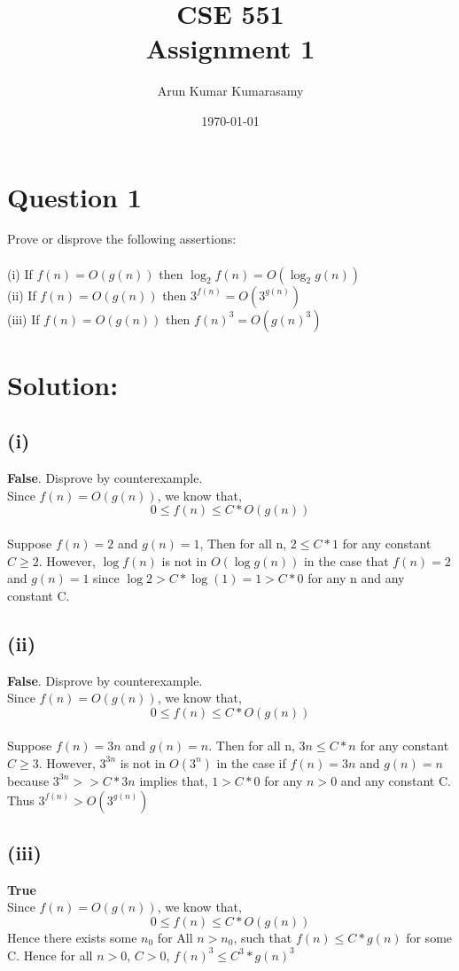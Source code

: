 \documentclass[12pt, letterpaper]{article}
\begin{document}
\title {\textbf {CSE 551
\\Assignment 1}}
\author {Arun Kumar Kumarasamy}
\date{\today}
\maketitle

\section*{Question 1}
 Prove or disprove the following assertions:\\ 
\\(i) If $f(n) =O(g(n))$ then $\log_2 f(n) =O(\log_2 g(n))$
\\(ii) If $f(n) =O(g(n))$ then $3^{f(n)}=O(3^{g(n)})$
\\(iii) If $f(n) =O(g(n))$ then $f(n)^{3}=O(g(n)^{3})$ 
\section*{Solution:}
\subsection*{(i)} \textbf{False}. Disprove by counterexample.
\\Since $f(n) = O(g(n))$, we know that, $$ 0 \leq  f(n) \leq C * O(g(n)) $$
\\Suppose $f(n) = 2$ and $g(n) = 1$, Then for all n,  $2 \leq C * 1$ for any constant $C \geq 2$. However, $\log f(n)$ is not in $O(\log g(n))$ in the case that $f(n) = 2$ and $ g(n) = 1$  since $ \log 2 > C * \log (1) = 1 > C * 0$ for any n and any constant C.\\
\subsection*{(ii)} \textbf{False}. Disprove by counterexample.
\\Since $f(n) = O(g(n))$, we know that, $$ 0 \leq  f(n) \leq C * O(g(n)) $$
\\Suppose $f(n) = 3n$ and $g(n) = n$. Then for all n, $3n \leq C * n$ for any constant $C \geq 3$. However, $3^{3n}$ is not in $O(3^{n})$ in the case if $f(n) = 3n$ and $g(n) =n$ because $3^{3n} >> C*3n$ implies that, $1>C*0$ for any $n>0$ and any constant C. Thus $3^{f(n)} > O(3^{g(n)})$
\subsection*{(iii)} \textbf{True}
\\Since $f(n) = O(g(n))$, we know that, $$ 0 \leq  f(n) \leq C * O(g(n)) $$
Hence there exists some $n_0$ for All $n>n_0$, such that $f(n) \leq C * g(n)$ for some C. Hence for all $n>0$, $C>0$, $f(n)^{3} \leq C^{3} * g(n)^{3}$
\end{document}
